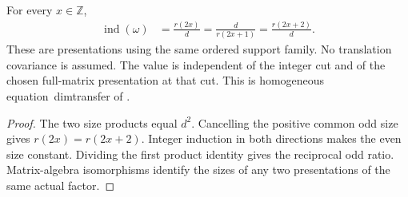 \begin{lemma}
    \label{thm:qca_gnvw_index_dimtransfer}
    \leanok
    For every $x\in\mathbb Z$,
    \begin{align}
        \operatorname{ind}(\omega)
         & =\frac{r(2x)}{d}
        =\frac{d}{r(2x+1)}
        =\frac{r(2x+2)}{d}.
        \label{eq:qca_gnvw_index_dimtransfer}
    \end{align}
    These are presentations using the same ordered support family. No
    translation covariance is assumed. The value is independent of the
    integer cut and of the chosen full-matrix presentation at that cut.
    This is homogeneous equation~dimtransfer of
    \cite[lines~1317--1324]{Gross2012IndexTheory}.
\end{lemma}
\begin{proof}\leanok
    The two size products equal $d^2$. Cancelling the positive common odd
    size gives $r(2x)=r(2x+2)$. Integer induction in both directions makes
    the even size constant. Dividing the first product identity gives
    the reciprocal odd ratio. Matrix-algebra isomorphisms identify the
    sizes of any two presentations of the same actual factor.
\end{proof}

